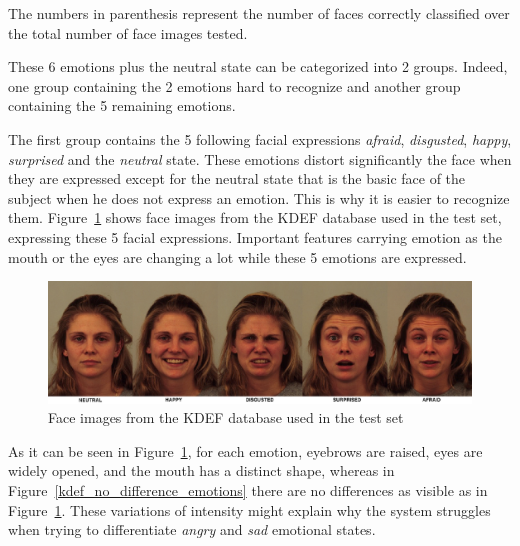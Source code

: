 \noindent The numbers in parenthesis represent the number of faces correctly classified over the total number of face images tested.
\newline

\noindent These 6 emotions plus the neutral state can be categorized into 2 groups. Indeed, one group containing the 2 emotions hard to recognize and another group containing the 5 remaining emotions.
\newline

\noindent The first group contains the 5 following facial expressions \textit{afraid}, \textit{disgusted}, \textit{happy}, \textit{surprised} and the \textit{neutral} state. These emotions distort significantly the face when they are expressed except for the neutral state that is the basic face of the subject when he does not express an emotion. This is why it is easier to recognize them. Figure~\ref{kdef_difference_emotions} shows face images from the KDEF database used in the test set, expressing these 5 facial expressions. Important features carrying emotion as the mouth or the eyes are changing a lot while these 5 emotions are expressed.
\newline

\begin{figure}[!h]
\begin{center}
\noindent \includegraphics[scale=0.3]{figures/kdef_difference_emotions} 
\newline
\caption{Face images from the KDEF database used in the test set}
\label{kdef_difference_emotions}
\end{center} 
\end{figure}

\noindent As it can be seen in Figure~\ref{kdef_difference_emotions}, for each emotion, eyebrows are raised, eyes are widely opened, and the mouth has a distinct shape, whereas in Figure~\ref{kdef_no_difference_emotions} there are no differences as visible as in Figure~\ref{kdef_difference_emotions}. These variations of intensity might explain why the system struggles when trying to differentiate \textit{angry} and \textit{sad} emotional states.
\newline

